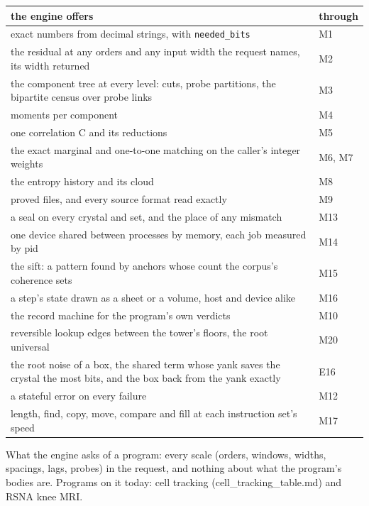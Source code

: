 {\small
\setlength{\tabcolsep}{6pt}
\begin{longtable}{>{\RaggedRight\arraybackslash}p{}>{\RaggedRight\arraybackslash}p{}}
\toprule
the engine offers & through \\
\midrule
\endhead
exact numbers from decimal strings, with \texttt{needed\_\allowbreak{}bits} & M1 \\
the residual at any orders and any input width the request names, its width returned & M2 \\
the component tree at every level: cuts, probe partitions, the bipartite census over probe links & M3 \\
moments per component & M4 \\
one correlation C and its reductions & M5 \\
the exact marginal and one-to-one matching on the caller's integer weights & M6, M7 \\
the entropy history and its cloud & M8 \\
proved files, and every source format read exactly & M9 \\
a seal on every crystal and set, and the place of any mismatch & M13 \\
one device shared between processes by memory, each job measured by pid & M14 \\
the sift: a pattern found by anchors whose count the corpus's coherence sets & M15 \\
a step's state drawn as a sheet or a volume, host and device alike & M16 \\
the record machine for the program's own verdicts & M10 \\
reversible lookup edges between the tower's floors, the root universal & M20 \\
the root noise of a box, the shared term whose yank saves the crystal the most bits, and the box back from the yank exactly & E16 \\
a stateful error on every failure & M12 \\
length, find, copy, move, compare and fill at each instruction set's speed & M17 \\
\bottomrule
\end{longtable}
}

What the engine asks of a program: every scale (orders, windows, widths, spacings, lags, probes) in the request, and nothing about what the program's bodies are. Programs on it today: cell tracking (cell\_\allowbreak{}tracking\_\allowbreak{}table.md) and RSNA knee MRI.

